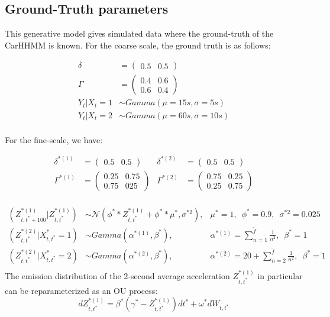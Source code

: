 \subsection{Ground-Truth parameters}

This generative model gives simulated data where the ground-truth of the CarHHMM is known. For the coarse scale, the ground truth is as follows:

\begin{align*}
    \delta &= \begin{pmatrix} 0.5 & 0.5 \end{pmatrix}\\
	\Gamma &= \begin{pmatrix} 0.4 & 0.6 \\ 0.6 & 0.4 \end{pmatrix} \\
	Y_t|X_t = 1 &\sim Gamma\left(\mu = 15 s, \sigma = 5 s\right) \\
	Y_t|X_t = 2 &\sim Gamma\left(\mu = 60 s, \sigma = 10 s\right) \\
\end{align*}

For the fine-scale, we have:

\begin{align*}
    \delta^{*(1)} &= \begin{pmatrix} 0.5 & 0.5 \end{pmatrix} & \delta^{*(2)} &= \begin{pmatrix} 0.5 & 0.5 \end{pmatrix} \\
    \Gamma^{*(1)} &= \begin{pmatrix} 0.25 & 0.75 \\ 0.75 & 025 \end{pmatrix} & 	\Gamma^{*(2)} &= \begin{pmatrix} 0.75 & 0.25 \\ 0.25 & 0.75 \end{pmatrix} \\
\end{align*}

\begin{align*}
    \left(Z^{*(1)}_{t,t^*+100} | Z^{*(1)}_{t,t^*} \right) &\sim \mathcal{N} \left(\phi^* * Z^{*(1)}_{t,t^*} + \phi^* * \mu^*, \sigma^{*2} \right), & \mu^* = 1, \enspace \phi^* = 0.9, \enspace \sigma^{*2} = 0.025 \\
    \left(Z^{*(2)}_{t,t^*} | X^*_{t,t^*} = 1\right) &\sim Gamma\left(\alpha^{*(1)}, \beta^* \right), & \alpha^{*(1)} = \sum_{n=1}^{\tilde{f}} \frac{1}{n^2}, \enspace \beta^* = 1 \\
    \left(Z^{*(2)}_{t,t^*} | X^*_{t,t^*} = 2\right) &\sim Gamma\left(\alpha^{*(2)}, \beta^* \right), & \alpha^{*(2)} = 20 + \sum_{n=2}^{\tilde{f}} \frac{1}{n^2}, \enspace \beta^* = 1 \\
\end{align*}
%
The emission distribution of the 2-second average acceleration $Z_{t,t^*}^{*(1)}$ in particular can be reparameterized as an OU process:
%
$$dZ^{*(1)}_{t,t^*} = \beta^*(\gamma^* - Z^{*(1)}_{t,t^*})dt^* + \omega^* dW_{t,t^*}$$

